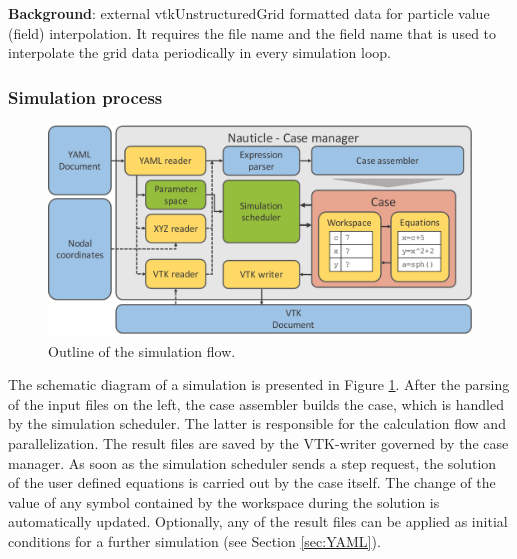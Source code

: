\documentclass[a4paper,12pt,openany]{book}
\theoremstyle{break}
\begin{document}
\textbf{Background}: external vtkUnstructuredGrid formatted data for particle value (field) interpolation. It requires the file name and the field name that is used to interpolate the grid data periodically in every simulation loop.

\subsubsection{Simulation process}
\begin{figure}[H]
  \includegraphics[scale=0.55]{workflow.pdf}
  \centering
  \caption{Outline of the simulation flow.}
  \label{fig:workflow}
\end{figure}

The schematic diagram of a simulation is presented in Figure \ref{fig:workflow}. After the parsing of the input files on the left, the case assembler builds the case, which is handled by the simulation scheduler. The latter is responsible for the calculation flow and parallelization. The result files are saved by the VTK-writer governed by the case manager. 
As soon as the simulation scheduler sends a step request, the solution of the user defined equations is carried out by the case itself. The change of the value of any symbol contained by the workspace during the solution is automatically updated. Optionally, any of the result files can be applied as initial conditions for a further simulation (see Section \ref{sec:YAML}).
\end{document}
